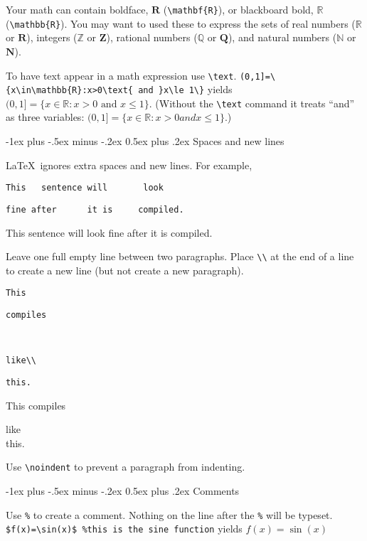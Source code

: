 \documentclass[10pt,landscape]{article}
\makeatletter
\renewcommand{\section}{\@startsection{section}{1}{0mm}%
                                {-1ex plus -.5ex minus -.2ex}%
                                {0.5ex plus .2ex}%
                                {\normalfont\large\bfseries}}
\makeatother
\begin{document}
\begin{multicols}{3}
    Your math can contain boldface, $\mathbf{R}$ (\verb!\mathbf{R}!), or blackboard bold, $\mathbb{R}$ (\verb!\mathbb{R}!). You may want to used these to express the sets of real numbers ($\mathbb{R}$ or $\mathbf{R}$), integers ($\mathbb{Z}$ or $\mathbf{Z}$), rational numbers ($\mathbb{Q}$ or $\mathbf{Q}$), and natural numbers ($\mathbb{N}$ or $\mathbf{N}$).

    To have text appear in a math expression use \verb!\text!. \verb!(0,1]=\{x\in\mathbb{R}:x>0\text{ and }x\le 1\}! yields $(0,1]=\{x\in\mathbb{R}:x>0\text{ and }x\le 1\}$. (Without the \verb!\text! command it treats ``and'' as three variables: $(0,1]=\{x\in\mathbb{R}:x>0 and x\le 1\}$.)



    \section{Spaces and new lines}

    \LaTeX\ ignores extra spaces and new lines. For example,

    \verb!This   sentence will       look!

    \verb!fine after      it is     compiled.!

    This   sentence will       look
    fine after      it is     compiled.


    Leave one full empty line between two paragraphs. Place \verb!\\! at the end of a line to create a new line (but not create a new paragraph).

    \verb!This!

    \verb!compiles!

    ~

    \verb!like\\!

    \verb!this.!

    This
    compiles

    like\\
    this.

    Use  \verb!\noindent! to prevent a paragraph from indenting.

    \section{Comments}

    Use \verb!%! to create a comment. Nothing on the line after the \verb!%! will be typeset. \verb!$f(x)=\sin(x)$ %this is the sine function! yields $f(x)=\sin(x)$%


\end{multicols}
\end{document}
